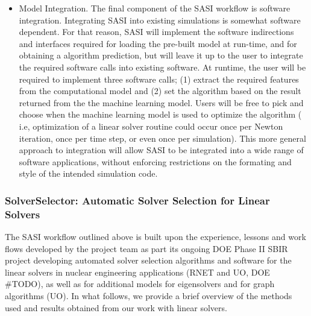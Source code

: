 \begin{itemize}
 \item Model Integration. The final component of the SASI workflow is software integration. Integrating SASI into existing simulations is somewhat software dependent. For that reason, SASI will implement the software indirections and interfaces required for loading the pre-built model at run-time, and for obtaining a algorithm prediction, but will leave it up to the user to integrate the required software calls into existing software. At runtime, the user will be required to implement three software calls; (1) extract the required features from the computational model and (2) set the algorithm based on the result returned from the the machine learning model. Users will be free to pick and choose when the machine learning model is used to optimize the algorithm ( i.e, optimization of a linear solver routine could occur once per Newton iteration, once per time step, or even once per simulation).  This more general approach to integration will allow SASI to be integrated into a wide range of software applications, without enforcing restrictions on the formating and style of the intended simulation code. 
\end{itemize}

\subsubsection{SolverSelector: Automatic Solver Selection for Linear Solvers} 

The SASI workflow outlined above is built upon the experience, lessons and work flows developed by the project team as part its ongoing DOE Phase II SBIR project developing automated solver selection algorithms and software for the linear solvers in nuclear engineering applications (RNET and UO, DOE \#TODO), as well as for additional models for eigensolvers and for graph algorithms (UO). In what follows, we provide a brief overview of the methods used and results obtained from our work with linear solvers. 

